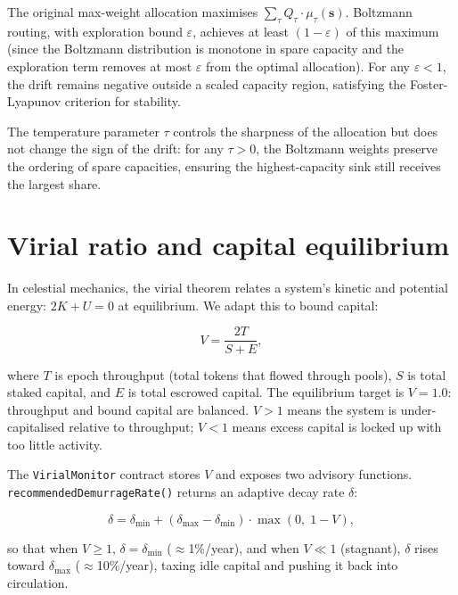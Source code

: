 \documentclass[11pt]{article}
\theoremstyle{definition}
\theoremstyle{remark}
\begin{document}
The original max-weight allocation maximises $\sum_\tau Q_\tau \cdot
\mu_\tau(\mathbf{s})$. Boltzmann routing, with exploration bound
$\varepsilon$, achieves at least $(1-\varepsilon)$ of this maximum
(since the Boltzmann distribution is monotone in spare capacity and
the exploration term removes at most $\varepsilon$ from the optimal
allocation). For any $\varepsilon < 1$, the drift remains negative
outside a scaled capacity region, satisfying the Foster-Lyapunov
criterion for stability.

The temperature parameter $\tau$ controls the sharpness of the
allocation but does not change the sign of the drift: for any
$\tau > 0$, the Boltzmann weights preserve the ordering of spare
capacities, ensuring the highest-capacity sink still receives the
largest share.

\section{Virial ratio and capital equilibrium}
\label{sec:virial}

In celestial mechanics, the virial theorem relates a system's kinetic
and potential energy: $2K + U = 0$ at equilibrium. We adapt this to
bound capital:

\begin{equation}
  V = \frac{2T}{S + E},
  \label{eq:virial}
\end{equation}

\noindent where $T$ is epoch throughput (total tokens that flowed
through pools), $S$ is total staked capital, and $E$ is total escrowed
capital. The equilibrium target is $V = 1.0$: throughput and bound
capital are balanced. $V > 1$ means the system is under-capitalised
relative to throughput; $V < 1$ means excess capital
is locked up with too little activity.

The \texttt{VirialMonitor} contract stores $V$ and exposes two
advisory functions. \texttt{recommendedDemurrageRate()} returns an
adaptive decay rate $\delta$:

\begin{equation}
  \delta = \delta_{\min} + (\delta_{\max} - \delta_{\min}) \cdot
           \max(0,\; 1 - V),
  \label{eq:demurrage}
\end{equation}

\noindent so that when $V \geq 1$, $\delta = \delta_{\min}$
($\approx$1\%/year), and when $V \ll 1$ (stagnant), $\delta$ rises
toward $\delta_{\max}$ ($\approx$10\%/year), taxing idle capital and
pushing it back into circulation.
\end{document}
